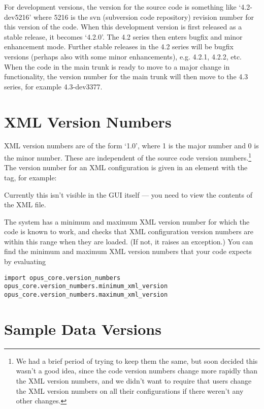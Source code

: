 For development versions, the version for the source code is something like
`4.2-dev5216' where 5216 is the svn (subversion code repository) revision
number for this version of the code.  When this development version is
first released as a stable release, it becomes `4.2.0'. The 4.2 series
then enters bugfix and minor enhancement mode.  Further stable releases in
the 4.2 series will be bugfix versions (perhaps also with some minor
enhancements), e.g. 4.2.1, 4.2.2, etc.  When the code in the main trunk is
ready to move to a major change in functionality, the version number for
the main trunk will then move to the 4.3 series, for example 4.3-dev3377.

\section{XML Version Numbers}

XML version numbers are of the form `1.0', where 1 is the major number and
0 is the minor number.  These are independent of the source code version
numbers.\footnote{We had a brief period of trying to keep them the same,
  but soon decided this wasn't a good idea, since the code version numbers
  change more rapidly than the XML version numbers, and we didn't want to
  require that users change the XML version numbers on all their
  configurations if there weren't any other changes.}  The version number
for an XML configuration is given in an element with the 
tag, for example:


Currently this isn't visible in the GUI itself --- you need to view the
contents of the XML file.

The system has a minimum and maximum XML version number for which the code
is known to work, and checks that XML configuration version numbers are
within this range when they are loaded.  (If not, it raises an exception.)
You can find the minimum and maximum XML version numbers that your code
expects by evaluating
\begin{verbatim}
import opus_core.version_numbers
opus_core.version_numbers.minimum_xml_version
opus_core.version_numbers.maximum_xml_version
\end{verbatim}

\section{Sample Data Versions}

